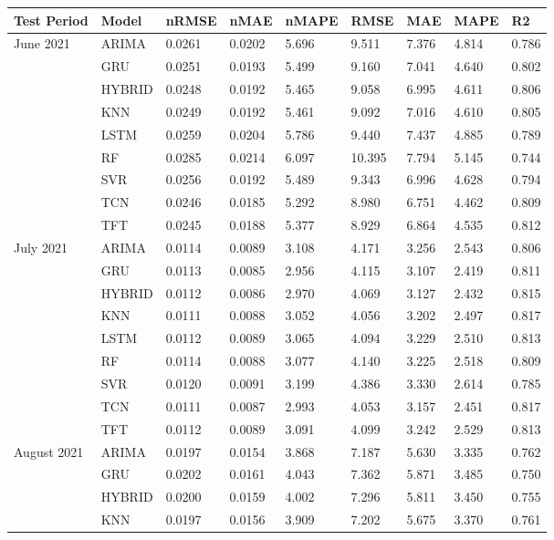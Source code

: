 \begin{tabular}{lllllllll}
\toprule
Test Period & Model & nRMSE & nMAE & nMAPE & RMSE & MAE & MAPE & R2 \\
\midrule
June 2021 & ARIMA & 0.0261 & 0.0202 & 5.696 & 9.511 & 7.376 & 4.814 & 0.786 \\
 & GRU & 0.0251 & 0.0193 & 5.499 & 9.160 & 7.041 & 4.640 & 0.802 \\
 & HYBRID & 0.0248 & 0.0192 & 5.465 & 9.058 & 6.995 & 4.611 & 0.806 \\
 & KNN & 0.0249 & 0.0192 & 5.461 & 9.092 & 7.016 & 4.610 & 0.805 \\
 & LSTM & 0.0259 & 0.0204 & 5.786 & 9.440 & 7.437 & 4.885 & 0.789 \\
 & RF & 0.0285 & 0.0214 & 6.097 & 10.395 & 7.794 & 5.145 & 0.744 \\
 & SVR & 0.0256 & 0.0192 & 5.489 & 9.343 & 6.996 & 4.628 & 0.794 \\
 & TCN & 0.0246 & 0.0185 & 5.292 & 8.980 & 6.751 & 4.462 & 0.809 \\
 & TFT & 0.0245 & 0.0188 & 5.377 & 8.929 & 6.864 & 4.535 & 0.812 \\
July 2021 & ARIMA & 0.0114 & 0.0089 & 3.108 & 4.171 & 3.256 & 2.543 & 0.806 \\
 & GRU & 0.0113 & 0.0085 & 2.956 & 4.115 & 3.107 & 2.419 & 0.811 \\
 & HYBRID & 0.0112 & 0.0086 & 2.970 & 4.069 & 3.127 & 2.432 & 0.815 \\
 & KNN & 0.0111 & 0.0088 & 3.052 & 4.056 & 3.202 & 2.497 & 0.817 \\
 & LSTM & 0.0112 & 0.0089 & 3.065 & 4.094 & 3.229 & 2.510 & 0.813 \\
 & RF & 0.0114 & 0.0088 & 3.077 & 4.140 & 3.225 & 2.518 & 0.809 \\
 & SVR & 0.0120 & 0.0091 & 3.199 & 4.386 & 3.330 & 2.614 & 0.785 \\
 & TCN & 0.0111 & 0.0087 & 2.993 & 4.053 & 3.157 & 2.451 & 0.817 \\
 & TFT & 0.0112 & 0.0089 & 3.091 & 4.099 & 3.242 & 2.529 & 0.813 \\
August 2021 & ARIMA & 0.0197 & 0.0154 & 3.868 & 7.187 & 5.630 & 3.335 & 0.762 \\
 & GRU & 0.0202 & 0.0161 & 4.043 & 7.362 & 5.871 & 3.485 & 0.750 \\
 & HYBRID & 0.0200 & 0.0159 & 4.002 & 7.296 & 5.811 & 3.450 & 0.755 \\
 & KNN & 0.0197 & 0.0156 & 3.909 & 7.202 & 5.675 & 3.370 & 0.761 \\

\end{tabular}
